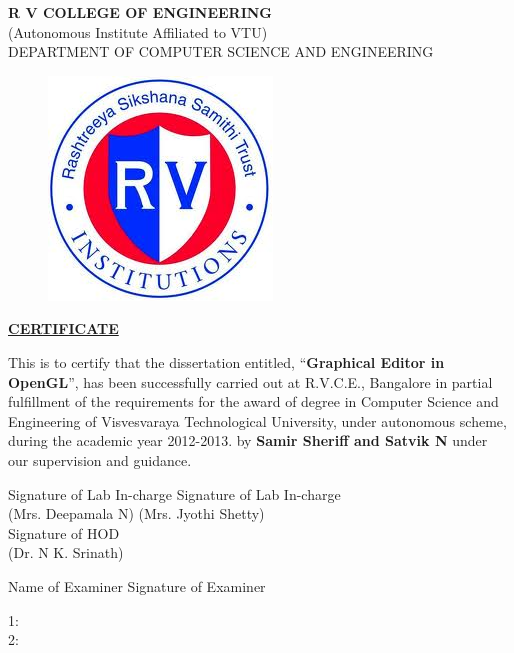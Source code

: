 \documentclass[12pt]{report}
\begin{document}
\begin{titlepage}
\newpage
\begin{center}
{\bfseries\large R V COLLEGE OF ENGINEERING}\\
{\normalsize (Autonomous Institute Affiliated to VTU)}\\
{\normalsize DEPARTMENT OF COMPUTER SCIENCE AND ENGINEERING}\\
\end{center}
	
\begin{figure}[h!]
	\centering
		\includegraphics[scale=0.5]{RVCE.png}
\end{figure}

\begin{center}
\bf{\underline{CERTIFICATE}}
\end{center}
\noindent This is to certify that the dissertation entitled, ``\textbf{Graphical Editor in OpenGL}'',  has been successfully carried out at R.V.C.E., Bangalore
 in partial fulfillment of the requirements for the award of degree 
 in Computer Science and Engineering of Visvesvaraya Technological University, under autonomous scheme, during the academic year 2012-2013.
by  \textbf{Samir Sheriff and Satvik N}  under our supervision and guidance.
\vspace{.5in}

\begin{flushleft} 
 Signature of Lab In-charge  \hspace{4cm} Signature of Lab In-charge \\
 (Mrs. Deepamala N) \hspace{6cm} (Mrs. Jyothi Shetty)\\
\vspace{0.75 in}
\hspace{10cm}
 Signature of HOD	
\\ \hspace{10cm} (Dr. N K. Srinath) \\

 \end{flushleft} 
\begin{flushleft}
\hspace{1in}Name of Examiner \hspace{1.25in} Signature of Examiner
\end{flushleft}
\begin{flushleft}
1: \\
\vspace{.5in} 
2: 
\end{flushleft}
\end{titlepage}
\end{document}
